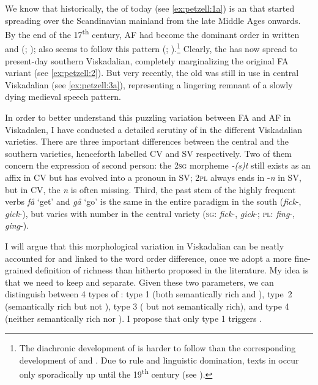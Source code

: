 \documentclass[output=paper,colorlinks,citecolor=brown,draft,draftmode]{langscibook}
\begin{document}
We know that historically, the  of today (see \ref{ex:petzell:1a}) is an  that started spreading over the Scandinavian mainland from the late Middle Ages onwards. By the end of the 17\textsuperscript{th} century, AF had become the dominant order in written  \citep{Sundquist2003} and  (\citealt{Falk1993}; \citealt{Hakansson2011});  also seems to follow this pattern (\citealt{Christoffersen1997}; \citealt{Vitterso2004}).\footnote{The diachronic development of  is harder to follow than the corresponding development of  and . Due to  rule and linguistic domination, texts in  occur only sporadically up until the 19\textsuperscript{th} century (see \citealt[177–192]{Indrebo2001}).} Clearly, the  has now spread to present-day southern Viskadalian, completely marginalizing the original FA variant (see \ref{ex:petzell:2}). But very recently, the old  was still in use in central Viskadalian (see \ref{ex:petzell:3a}), representing a lingering remnant of a slowly dying medieval speech pattern.



In order to better understand this puzzling variation between FA and AF in Viskadalen, I have conducted a detailed scrutiny of  in the different Viskadalian varieties. There are three important differences between the central and the southern varieties, henceforth labelled CV and SV respectively. Two of them concern the expression of second person: the 2\textsc{sg} morpheme \textit{-(s)t} still exists as an affix in CV but has evolved into a pronoun in SV; 2\textsc{pl} always ends in -\textit{n} in SV, but in CV, the \textit{n} is often missing. Third, the past  stem of the highly frequent verbs \textit{få} ‘get’ and \textit{gå} ‘go’ is the same in the entire paradigm in the south (\textit{fick}-, \textit{gick}-), but varies with number in the central variety (\textsc{sg}: \textit{fick}-, \textit{gick}-; \textsc{pl}: \textit{fing}-, \textit{ging}-).



I will argue that this morphological variation in Viskadalian can be neatly accounted for and linked to the word order difference, once we adopt a more fine-grained definition of  richness than hitherto proposed in the literature. My idea is that we need to keep  and  separate. Given these two parameters, we can distinguish between 4 types of : type 1 (both semantically rich and ), type~2 (semantically rich but not ), type 3 ( but not semantically rich), and type 4 (neither semantically rich nor ). I propose that only type 1  triggers .
\end{document}
